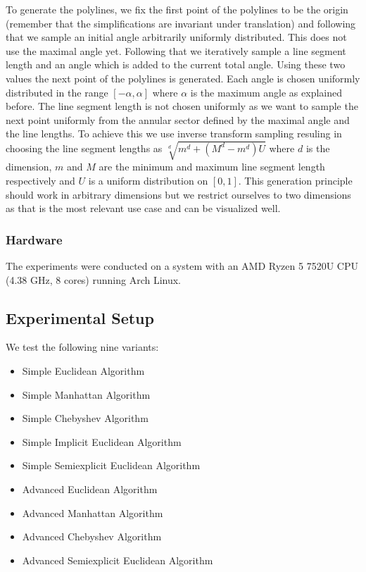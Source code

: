To generate the polylines, we fix the first point of the polylines to be the origin (remember that the simplifications are invariant under translation) and following that we sample an initial angle arbitrarily uniformly distributed. This does not use the maximal angle yet. Following that we iteratively sample a line segment length and an angle which is added to the current total angle. Using these two values the next point of the polylines is generated. Each angle is chosen uniformly distributed in the range \([-\alpha, \alpha]\) where \(\alpha\) is the maximum angle as explained before. The line segment length is not chosen uniformly as we want to sample the next point uniformly from the annular sector defined by the maximal angle and the line lengths. To achieve this we use inverse transform sampling resuling in choosing the line segment lengths as \(\sqrt[d]{m^d + (M^d-m^d)U}\) where \(d\) is the dimension, \(m\) and \(M\) are the minimum and maximum line segment length respectively and \(U\) is a uniform distribution on \([0,1]\). This generation principle should work in arbitrary dimensions but we restrict ourselves to two dimensions as that is the most relevant use case and can be visualized well.

\subsubsection{Hardware}
\label{subsubsec:hardware}
The experiments were conducted on a system with an AMD Ryzen 5 7520U CPU (4.38 GHz, 8 cores) running Arch Linux.

\subsection{Experimental Setup}
\label{subsec:exp_setup}

We test the following nine variants:
\begin{itemize}
	\item Simple Euclidean Algorithm 
	\item Simple Manhattan Algorithm 
	\item Simple Chebyshev Algorithm 
	\item Simple Implicit Euclidean Algorithm 
	\item Simple Semiexplicit Euclidean Algorithm 
	\item Advanced Euclidean Algorithm 
	\item Advanced Manhattan Algorithm 
	\item Advanced Chebyshev Algorithm 
	\item Advanced Semiexplicit Euclidean Algorithm 
\end{itemize}

